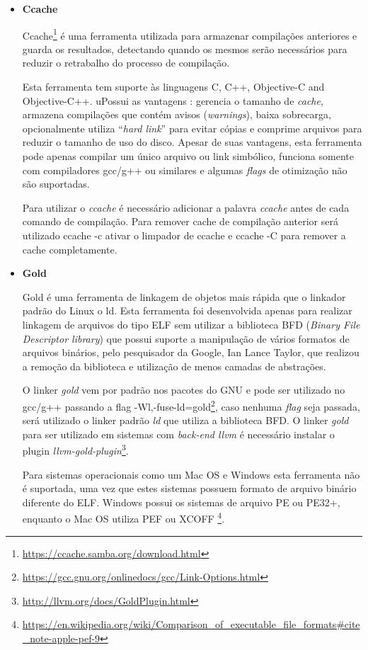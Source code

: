 \begin{itemize}
	\item \textbf{Ccache} \label{ccache}
	
	\subitem Ccache\footnote{\url{https://ccache.samba.org/download.html}} é uma ferramenta utilizada
 para armazenar compilações anteriores e 
guarda os resultados, detectando quando os mesmos serão necessários
 para reduzir o retrabalho do processo de compilação.

    \subitem Esta ferramenta tem suporte às linguagens C, C++, Objective-C and Objective-C++.
uPossui as vantagens : gerencia o tamanho de \textit{cache},
 armazena compilações que contém avisos (\textit{warnings}), baixa sobrecarga,
 opcionalmente utiliza “\textit{hard link}” para evitar cópias e comprime arquivos para
 reduzir o tamanho de uso do disco. Apesar de suas vantagens, esta ferramenta pode apenas
 compilar um único arquivo ou link simbólico, funciona somente com compiladores gcc/g++
 ou similares e algumas \textit{flags} de otimização não são suportadas.

	\subitem Para utilizar o \textit{ccache} é necessário adicionar a palavra \textit{ccache} antes de cada
 comando de compilação. Para remover cache de compilação anterior será utilizado
 ccache -c ativar o limpador de ccache e ccache -C para remover a cache completamente.

	\item \textbf{Gold} \label{Gold}

	\subitem Gold é uma ferramenta de linkagem de objetos mais rápida que o linkador padrão do Linux o
 ld. Esta ferramenta foi desenvolvida apenas para realizar linkagem de arquivos do tipo ELF sem utilizar
 a biblioteca BFD (\textit{Binary File Descriptor library}) que possui suporte a manipulação de vários
 formatos de arquivos binários, pelo pesquisador da Google,
 Ian Lance Taylor, que realizou a remoção da biblioteca e utilização de menos camadas de abstrações.

	\subitem O linker \textit{gold} vem por padrão nos pacotes do GNU e pode ser utilizado no gcc/g++ passando a flag
 -Wl,-fuse-ld=gold\footnote{\url{https://gcc.gnu.org/onlinedocs/gcc/Link-Options.html}},
 caso nenhuma \textit{flag} seja passada, será utilizado o linker padrão \textit{ld} que utiliza
 a biblioteca BFD. O linker \textit{gold} para ser utilizado em sistemas com \textit{back-end llvm} é necessário
 instalar o plugin \textit{llvm-gold-plugin}\footnote{\url{http://llvm.org/docs/GoldPlugin.html}}.

	\subitem Para sistemas operacionais como um Mac OS e Windows esta ferramenta não é suportada, uma vez que
estes sistemas possuem formato de arquivo binário diferente do ELF. Windows possui os sistemas de arquivo PE ou PE32+, enquanto 
o Mac OS utiliza PEF ou XCOFF
\footnote{\url{https://en.wikipedia.org/wiki/Comparison\_of\_executable\_file\_formats\#cite\_note-apple-pef-9}}.
\end{itemize}
